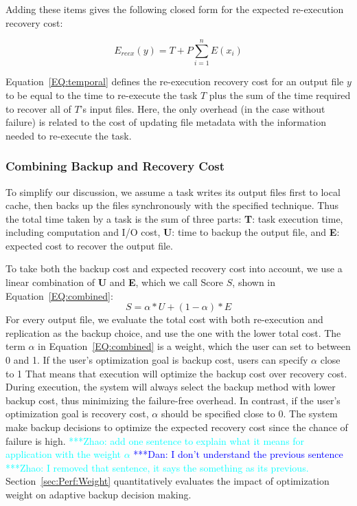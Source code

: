 \documentclass{sig-alternate}
\newcommand{\iannote}[1]{ {\textcolor{red}    { ***Ian:      #1 }}}
\newcommand{\katznote}[1]{ {\textcolor{blue}    { ***Dan:      #1 }}}
\newcommand{\zhaonote}[1]{{\textcolor{cyan}    { ***Zhao:      #1 }}}
\newcommand{\iannote}[1]{}
\newcommand{\katznote}[1]{}
\newcommand{\zhaonote}[1]{}
\begin{document}
Adding these items gives the following closed form for the expected re-execution recovery cost:

\begin{equation}
E_{reex}(y) = T+P\sum_{i=1}^{n}E(x_i)
\label{EQ:temporal}
\end{equation}

Equation~\ref{EQ:temporal} defines the re-execution recovery cost for an output file $y$ to be
equal to the time to re-execute the task $T$ plus the sum of the time required to recover all of $T$'s
input files. Here, the only overhead (in the case without failure) is related to 
the cost of updating file metadata with the information needed to re-execute the task.

\subsubsection{Combining Backup and Recovery Cost}
To simplify our discussion, we assume a task writes its output files first to local cache, then backs up the files synchronously with the specified technique. Thus the total time taken by a task is the sum of three parts:
{\bf T}: task execution time, including computation and I/O cost,
{\bf U}: time to backup the output file,
and {\bf E}: expected cost to recover the output file.

To take both the backup cost and expected recovery cost into account, we use a linear combination of {\bf U} and {\bf E}, which we call %
Score $S$, shown in Equation~\ref{EQ:combined}:
\begin{equation}
S=\alpha*U+(1-\alpha)*E
\label{EQ:combined}
\end{equation}
%
For every output file, we evaluate the total cost with both re-execution and replication as the backup choice, and use the one with the lower total cost.
The term $\alpha$ in Equation~\ref{EQ:combined} is a weight, which the user can set to between 0 and 1. 
 If the user's optimization goal is backup cost, users can specify $\alpha$ close to 1
That means that execution will optimize the backup cost over recovery cost. 
During execution, the system will always select the backup method with lower backup cost, thus minimizing the failure-free overhead.
In contrast, if the user's optimization goal is recovery cost, $\alpha$ should be specified close to 0. 
The system make backup decisions to optimize the expected recovery cost since the chance of failure is high. 
\zhaonote{add one sentence to explain what it means for application with the weight $\alpha$} 
\katznote{I don't understand the previous sentence}
\zhaonote{I removed that sentence, it says the something as its previous.}
Section~\ref{sec:Perf:Weight} quantitatively evaluates the impact of optimization weight on adaptive backup decision making. 
\end{document}
